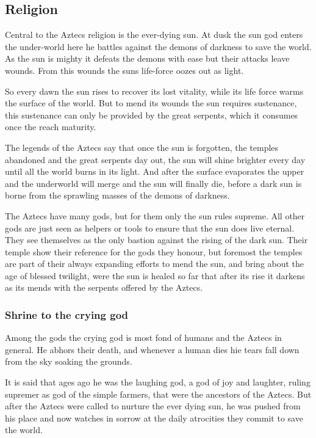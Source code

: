 \subsection{Religion}
Central to the \gls{Aztecs} religion is the ever-dying sun. At dusk the sun god
enters the under-world here he battles against the demons of darkness to save
the world. As the sun is mighty it defeats the demons with ease but their
attacks leave wounds. From this wounds the suns life-force oozes out as light.

So every dawn the sun rises to recover its lost vitality, while its life force
warms the surface of the world. But to mend its wounds the sun requires
sustenance, this sustenance can only be provided by the great serpents, which
it consumes once the reach maturity.

The legends of the \gls{Aztecs} say that once the sun is forgotten, the temples
abandoned and the great serpents day out, the sun will shine brighter every day
until all the world burns in its light. And after the surface evaporates the
upper and the underworld will merge and the sun will finally die, before a dark
sun is borne from the sprawling masses of the demons of darkness.

The \gls{Aztecs} have many gods, but for them only the sun rules supreme. All
other gods are just seen as helpers or tools to ensure that the sun does live
eternal. They see themselves as the only bastion against the rising of the dark
sun. Their temple show their reference for the gods they honour, but foremost
the temples are part of their always expanding efforts to mend the sun, and
bring about the age of blessed twilight, were the sun is healed so far that
after its rise it darkens as its mends with the serpents offered by the
\gls{Aztecs}.

\subsubsection{Shrine to the crying god}
Among the gods the crying god is most fond of humans and the \gls{Aztecs} in
general. He abhors their death, and whenever a human dies hie tears fall down
from the sky soaking the grounds.

It is said that ages ago he was the laughing god, a god of joy and laughter,
ruling supremer as god of the simple farmers, that were the ancestors of the
\gls{Aztecs}. But after the \gls{Aztecs} were called to nurture the ever dying
sun, he was pushed from his place and now watches in sorrow at the daily
atrocities they commit to save the world.

